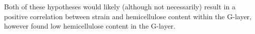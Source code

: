 Both of these hypotheses would likely (although not necessarily) result in a
positive correlation between strain and hemicellulose content within the
G-layer, however \citet{M_ller_2006} found low hemicellulose content in the
G-layer.